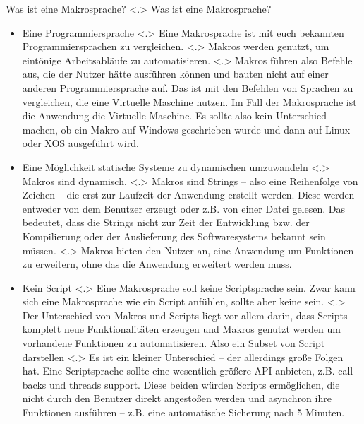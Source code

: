   \begin{frame}{Was ist eine Makrosprache?}
    \pause
        \note[item]<.>{
          Was ist eine Makrosprache?
        }

    \begin{itemize}[<+- | alert@+>]
      \item
        Eine Programmiersprache
            \note[item]<.>{
              Eine Makrosprache ist mit euch bekannten Programmiersprachen zu vergleichen.
            }
            \note[item]<.>{
              Makros werden genutzt, um eintönige Arbeitsabläufe zu automatisieren.
            }
            \note[item]<.>{
              Makros führen also Befehle aus, die der Nutzer hätte ausführen können und bauten nicht auf einer anderen Programmiersprache auf. Das ist mit den Befehlen von Sprachen zu vergleichen, die eine Virtuelle Maschine nutzen. Im Fall der Makrosprache ist die Anwendung die Virtuelle Maschine. Es sollte also kein Unterschied machen, ob ein Makro auf Windows geschrieben wurde und dann auf Linux oder XOS ausgeführt wird.
            }

      \item
        Eine Möglichkeit statische Systeme zu dynamischen umzuwandeln
            \note[item]<.>{
              Makros sind dynamisch.
            }
            \note[item]<.>{
              Makros sind Strings -- also eine Reihenfolge von Zeichen -- die erst zur Laufzeit der Anwendung erstellt werden. Diese werden entweder von dem Benutzer erzeugt oder z.B. von einer Datei gelesen. Das bedeutet, dass die Strings nicht zur Zeit der Entwicklung bzw. der Kompilierung oder der Auslieferung des Softwaresystems bekannt sein müssen.
            }
            \note[item]<.>{
              Makros bieten den Nutzer an, eine Anwendung um Funktionen zu erweitern, ohne das die Anwendung erweitert werden muss.
            }

      \item
        Kein Script
            \note[item]<.>{
              Eine Makrosprache soll keine Scriptsprache sein. Zwar kann sich eine Makrosprache wie ein Script anfühlen, sollte aber keine sein.
            }
            \note[item]<.>{
              Der Unterschied von Makros und Scripts liegt vor allem darin, dass Scripts komplett neue Funktionalitäten erzeugen und Makros genutzt werden um vorhandene Funktionen zu automatisieren. Also ein Subset von Script darstellen
            }
            \note[item]<.>{
              Es ist ein kleiner Unterschied -- der allerdings große Folgen hat. Eine Scriptsprache sollte eine wesentlich größere API anbieten, z.B. call-backs und threads support. Diese beiden würden Scripts ermöglichen, die nicht durch den Benutzer direkt angestoßen werden und asynchron ihre Funktionen ausführen -- z.B. eine automatische Sicherung nach 5 Minuten.
            }
    \end{itemize}
  \end{frame}


